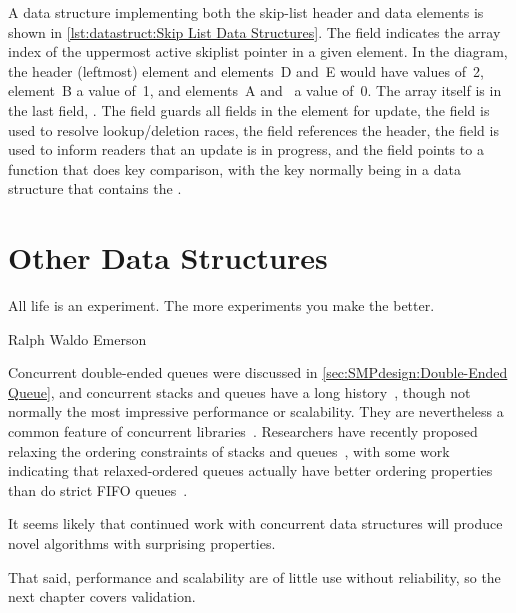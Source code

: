A data structure implementing both the skip-list header and data
elements is shown in
\cref{lst:datastruct:Skip List Data Structures}.
The  field indicates the array index of the uppermost
active skiplist pointer in a given element.
In the diagram, the header (leftmost) element and elements~D and~E
would have  values of~2, element~B a value of~1,
and elements~A and~ a value of~0.
The array itself is in the last field, .
The  field guards all fields in the element for update,
the  field is used to resolve lookup/deletion races,
the  field references the header,
the  field is used to inform readers that an update is in
progress,
and the  field points to a function that does key
comparison, with the key normally being in a data structure that contains
the .

\QuickQuizEnd

\section{Other Data Structures}
\label{sec:skiplist:Other Data Structures}
%
\epigraph{All life is an experiment.
	  The more experiments you make the better.}
	 {Ralph Waldo Emerson}

Concurrent double-ended queues were discussed in
\cref{sec:SMPdesign:Double-Ended Queue},
and concurrent stacks and queues have a long history~\cite{Treiber86},
though not normally the most impressive performance or scalability.
They are nevertheless a common feature of concurrent
libraries~\cite{PaulMcKenney2013LWNURCUqueuestack}.
Researchers have recently proposed relaxing the ordering constraints
of stacks and queues~\cite{Shavit:2011:DSM:1897852.1897873},
with some work indicating that relaxed-ordered queues actually have
better ordering properties than do strict FIFO
queues~\cite{AndreasHaas2012FIFOisnt,ChristophMKirsch2012FIFOisntTR,AndreasHaas2013CFRelaxedQueues}.

It seems likely that continued work with concurrent data structures will
produce novel algorithms with surprising properties.

That said, performance and scalability are of little use without reliability,
so the next chapter covers validation.

